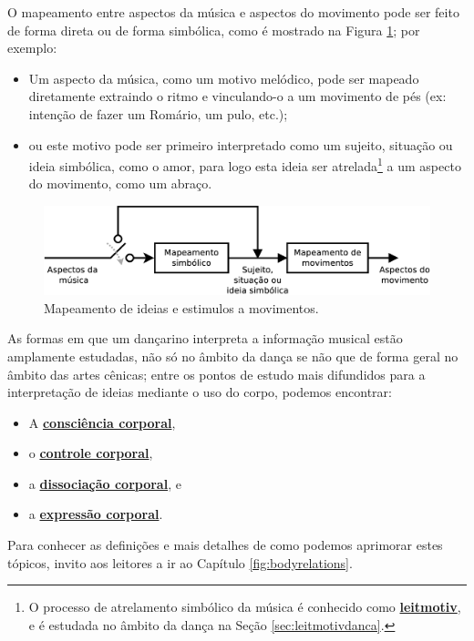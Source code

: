 O mapeamento entre aspectos da música e aspectos do movimento 
pode ser feito de forma direta ou de forma simbólica, como é mostrado na Figura \ref{fig:mapeamento};
por exemplo:
\begin{itemize}
\item Um aspecto da música, como um motivo melódico,
pode ser mapeado diretamente extraindo o ritmo e vinculando-o a um movimento de pés (ex: intenção de fazer um Romário, um pulo, etc.);
\item ou este motivo pode ser primeiro interpretado como um sujeito, situação ou ideia simbólica,
como o amor, para logo esta ideia ser atrelada\footnote{O 
processo de atrelamento simbólico da música é conhecido como \hyperref[sec:leitmotivdanca]{\textbf{leitmotiv}}, 
e é estudada no âmbito da dança na Seção \ref{sec:leitmotivdanca}.} a um aspecto do movimento, como um abraço.  
\end{itemize}

\begin{figure}[!h]
  \centering
    \includegraphics[width=1.00\textwidth]{chapters/cap-musicalidade/mapeamento.eps}
\caption{Mapeamento de ideias e estimulos a movimentos.}
\label{fig:mapeamento}
\end{figure}


As formas em que um dançarino interpreta a informação musical estão amplamente estudadas, 
não só no âmbito da dança se não que de forma geral no âmbito das artes cênicas;
entre os pontos de estudo mais difundidos 
para a interpretação de ideias mediante o uso do corpo, podemos encontrar:
\begin{itemize}
\item A \hyperref[sec:BodyAwareness]{\textbf{consciência corporal}},
\item o \hyperref[sec:BodyControl]{\textbf{controle corporal}},
\item a \hyperref[sec:BodyIsolation]{\textbf{dissociação corporal}}, e
\item a \hyperref[sec:BodyExpression]{\textbf{expressão corporal}}.
\end{itemize}
Para conhecer as definições e mais detalhes de como podemos aprimorar estes tópicos,
invito aos leitores a ir ao Capítulo \ref{fig:bodyrelations}.

